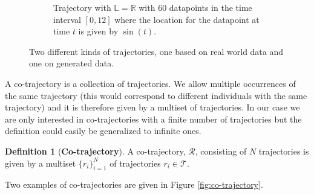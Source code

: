 \documentclass[12pt]{article}
\newcommand{\R}{\mathbb{R}}
\newcommand{\tim}{t}
\newcommand{\traj}{r}
\newcommand{\cotraj}{\mathcal{R}}
\newcommand{\locset}{\mathbb{L}}
\newcommand{\trajset}{\mathcal{T}}
\theoremstyle{definition}
\newtheorem{definition}{Definition}[section]
\begin{document}
\begin{figure}
\begin{subfigure}[t]{0.45\textwidth}
    \caption{Trajectory with \(\locset = \R\) with 60 datapoints in
      the time interval \([0, 12]\) where the location for the
      datapoint at time \(\tim\) is given by \(\sin(\tim)\).}
    \label{fig:trajectory-tempospatial}
  \end{subfigure}
  \caption{Two different kinds of trajectories, one based on real
    world data and one on generated data.}
  \label{fig:trajectory}
\end{figure}

A co-trajectory is a collection of trajectories. We allow multiple
occurrences of the same trajectory (this would correspond to different
individuals with the same trajectory) and it is therefore given by a
multiset of trajectories. In our case we are only interested in
co-trajectories with a finite number of trajectories but the
definition could easily be generalized to infinite ones.
\begin{definition}[\textbf{Co-trajectory}]
  \label{def:co-trajectory}
  A co-trajectory, \(\cotraj\), consisting of \(N\) trajectories is
  given by a multiset \(\{\traj_{i}\}_{i = 1}^{N}\) of trajectories
  \(\traj_{i} \in \trajset\).
\end{definition}
Two examples of co-trajectories are given in Figure
\ref{fig:co-trajectory}.
\end{document}
